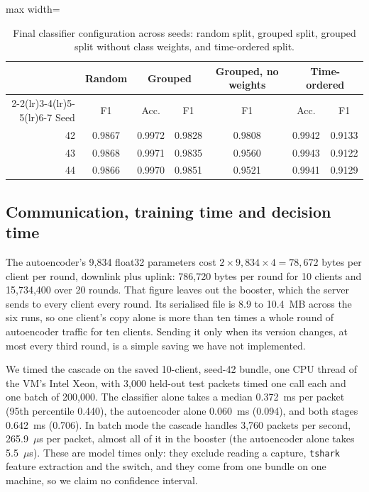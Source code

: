 \begin{table}[t]
\centering
\caption{Final classifier configuration across seeds: random split, grouped split, grouped split without class weights, and time-ordered split.}
\label{tab:seeds}
\small
\setlength{\tabcolsep}{3pt}
\begin{adjustbox}{max width=\linewidth}
\begin{tabular}{rcccccc}
\toprule
 & Random & \multicolumn{2}{c}{Grouped} & Grouped, no weights & \multicolumn{2}{c}{Time-ordered} \\
\cmidrule(lr){2-2}\cmidrule(lr){3-4}\cmidrule(lr){5-5}\cmidrule(lr){6-7}
Seed & F1 & Acc. & F1 & F1 & Acc. & F1 \\
\midrule
42 & 0.9867 & 0.9972 & 0.9828 & 0.9808 & 0.9942 & 0.9133 \\
43 & 0.9868 & 0.9971 & 0.9835 & 0.9560 & 0.9943 & 0.9122 \\
44 & 0.9866 & 0.9970 & 0.9851 & 0.9521 & 0.9941 & 0.9129 \\
\bottomrule
\end{tabular}
\end{adjustbox}
\end{table}

\subsection{Communication, training time and decision time}
The autoencoder's 9,834 float32 parameters cost $2\times9{,}834\times4=78{,}672$ bytes per client per round, downlink plus uplink: 786,720 bytes per round for 10 clients and 15,734,400 over 20 rounds. That figure leaves out the booster, which the server sends to every client every round. Its serialised file is 8.9 to 10.4~MB across the six runs, so one client's copy alone is more than ten times a whole round of autoencoder traffic for ten clients. Sending it only when its version changes, at most every third round, is a simple saving we have not implemented.

We timed the cascade on the saved 10-client, seed-42 bundle, one CPU thread of the VM's Intel Xeon, with 3,000 held-out test packets timed one call each and one batch of 200,000. The classifier alone takes a median 0.372~ms per packet (95th percentile 0.440), the autoencoder alone 0.060~ms (0.094), and both stages 0.642~ms (0.706). In batch mode the cascade handles 3,760 packets per second, 265.9~$\mu$s per packet, almost all of it in the booster (the autoencoder alone takes 5.5~$\mu$s). These are model times only: they exclude reading a capture, \texttt{tshark} feature extraction and the switch, and they come from one bundle on one machine, so we claim no confidence interval.
